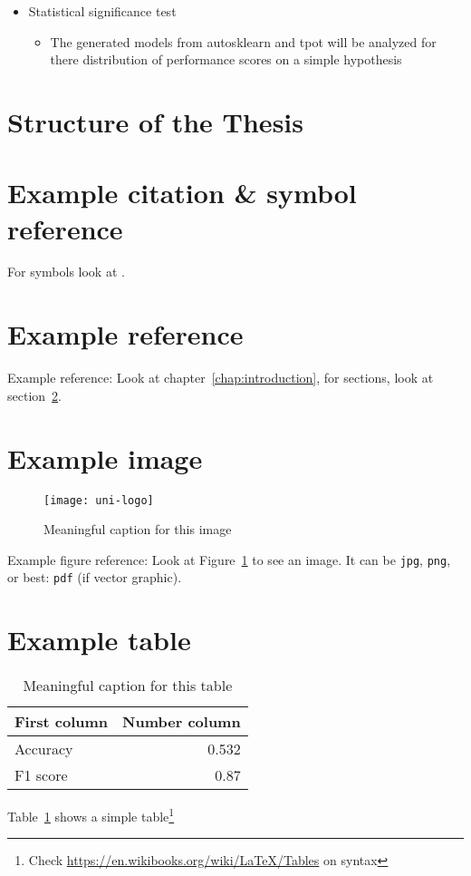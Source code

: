 \begin{itemize}
    \item Statistical significance test
    \begin{itemize}
        \item The generated models from autosklearn and tpot will be analyzed for there distribution of performance scores on a simple hypothesis
    \end{itemize}





\end{itemize}
\section{Structure of the Thesis}



\section{Example citation \& symbol reference}\label{sec:citation}
For symbols look at \cite{latex_symbols_2017}.


\section{Example reference}
Example reference: Look at chapter~\ref{chap:introduction}, for sections, look at section~\ref{sec:citation}.

\section{Example image}

\begin{figure}
	\centering
	\texttt{[image: uni-logo]}
	\caption{Meaningful caption for this image}
	\label{fig:uniLogo}
\end{figure}

Example figure reference: Look at Figure~\ref{fig:uniLogo} to see an image. It can be \texttt{jpg}, \texttt{png}, or best: \texttt{pdf} (if vector graphic).

\section{Example table}

\begin{table}
	\centering
	\begin{tabular}{lr}
		First column & Number column \\
		\hline
		Accuracy & 0.532 \\
		F1 score & 0.87
	\end{tabular}
	\caption{Meaningful caption for this table}
	\label{tab:result}
\end{table}

Table~\ref{tab:result} shows a simple table\footnote{Check \url{https://en.wikibooks.org/wiki/LaTeX/Tables} on syntax}